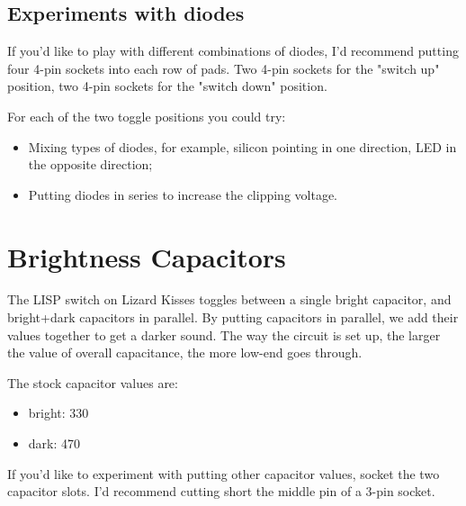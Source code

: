 \documentclass[a4paper,12pt]{article}
\begin{document}
\subsection{Experiments with diodes}

If you'd like to play with different
combinations of diodes, I'd recommend putting four 4-pin
sockets into each row of pads. Two 4-pin sockets for the
"switch up" position, two 4-pin sockets for the "switch
down" position.

For each of the two toggle positions you could try:

\begin{itemize}
  \item Mixing types of diodes, for example, silicon pointing
    in one direction, LED in the opposite direction;
  \item Putting diodes in series to increase the clipping
    voltage.
\end{itemize}




\pagebreak

\section{Brightness Capacitors}
\label{sec:caps}

The LISP switch on Lizard Kisses toggles between a single
bright capacitor, and bright+dark capacitors in parallel. By
putting capacitors in parallel, we add their values together
to get a darker sound. The way the circuit is set up, the
larger the value of overall capacitance, the more low-end
goes through.

The stock capacitor values are:

\begin{itemize}
  \item bright: \SI{330}{\nF}
  \item dark: \SI{470}{\nF}
\end{itemize}

If you'd like to experiment with putting other capacitor values,
socket the two capacitor slots. I'd recommend cutting short
the middle pin of a 3-pin socket.
\end{document}
